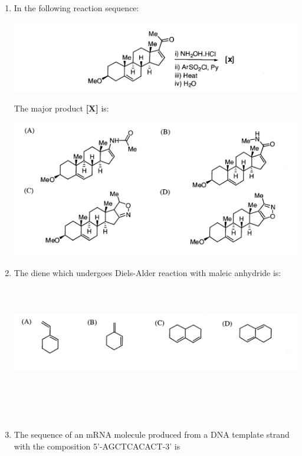 \documentclass[journal,12pt,onecolumn]{IEEEtran}
\theoremstyle{remark}
\begin{document}
\begin{enumerate}
 

\item    In the following reaction sequence: \hfill{}
 

\begin{center}

\includegraphics[scale=0.75]{figs/image4.png}

\end{center}
\noindent The major product \textbf{[X]} is:
  

\includegraphics[scale=0.75]{figs/image5.png}

 


\item    The diene which undergoes Diels-Alder reaction with maleic anhydride is:  \hfill{}
 
\includegraphics[height=5cm,width=18cm]{figs/image6.png}
 

\newpage
\

\item    \hspace{0.5cm} The sequence of an mRNA molecule produced from a DNA template strand with the composition 5'-AGCTCACACT-3' is  \hfill{}


\end{enumerate}
\end{document}
